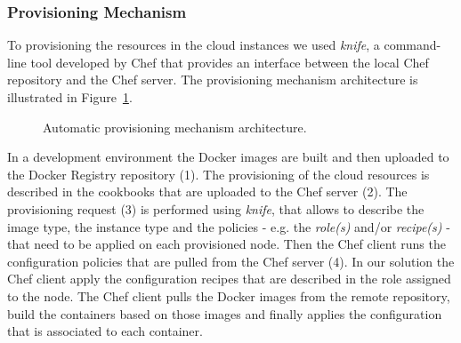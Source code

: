 \subsubsection{Provisioning Mechanism}
\label{subs:provisioning_mechanism}
To provisioning the resources in the cloud instances we used \textit{knife}, a command-line tool
developed by Chef that provides an interface between the local Chef repository and the Chef server.
The provisioning mechanism architecture is illustrated in Figure~\ref{fig:provisioning_tech_architecture}.\\

\begin{figure}[ht!]
\centering
{}%
\caption[Provisioning mechanism architecture.]{Automatic provisioning mechanism architecture.}
\label{fig:provisioning_tech_architecture}
\end{figure}

In a development environment the Docker images are built and then uploaded to the Docker Registry
repository (1). The provisioning of the cloud resources is described in the cookbooks that are uploaded
to the Chef server (2). The provisioning request (3) is performed using \textit{knife}, that allows to
describe the image type, the instance type and the policies - e.g. the \textit{role(s)} and/or \textit{recipe(s)} -
that need to be applied on each provisioned node. Then the Chef client runs the configuration policies
that are pulled from the Chef server (4). In our solution the Chef client apply the configuration recipes
that are described in the role assigned to the node. The Chef client pulls the Docker images from the
remote repository, build the containers based on those images and finally applies the configuration
that is associated to each container.\\

